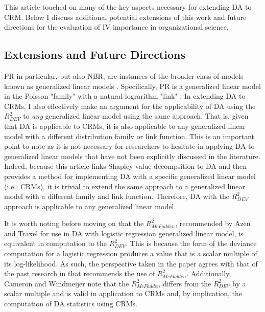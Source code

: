 \documentclass[ShortAfour,times,sageapa]{sagej}
\begin{document}
	This article touched on many of the key aspects necessary for extending DA to CRM.
	Below I discuss additional potential extensions of this work and future directions for the evaluation of IV importance in organizational science.
	
	\subsection{Extensions and Future Directions}
	
	PR in particular, but also NBR, are instances of the broader class of models known as generalized linear models \cite{mccullagh2019generalized}. 
	Specifically, PR is a generalized linear model in the Poisson "family" with a natural lograrithm "link" \cite[See implementation of generalized linear models in the R software;]{R}.
	In extending DA to CRMs, I also effectively make an argument for the applicability of DA using the $R^2_{DEV}$ to \emph{any} generalized linear model using the same approach.
	That is, given that DA is applicable to CRMs, it is also applicable to any generalized linear model with a different distribution family or link function.
	This is an important point to note as it is not necessary for researchers to hesitate in applying DA to generalized linear models that have not been explicitly discussed in the literature.
	Indeed, because this article links Shapley value decompsition to DA and then provides a method for implementing DA with a specific generalized linear model (i.e., CRMs), it is trivial to extend the same approach to a generalized linear model with a different family and link function.
	Therefore, DA with the $R^2_{DEV}$ approach is applicable to any generalized linear model.
	
	It is worth noting before moving on that the $R^2_{McFadden}$, recommended by Azen and Traxel \cite{azen2009using} for use in DA with logistic regression generalized linear model, is equivalent in computation to the $R^2_{DEV}$. 
	This is because the form of the deviance computation for a logistic regression produces a value that is  a scalar multiple of its log-likelihood. 
	As such, the perspective taken in the paper agrees with that of the past research in that recommends the use of $R^2_{McFadden}$. 
	Additionally, Cameron and Windmeijer \cite{cameron1996r} note that the $R^2_{McFadden}$ differs from the $R^2_{DEV}$ by a scalar multiple and is valid in application to CRMs and, by implication, the computation of DA statistics using CRMs.
	
\end{document}
